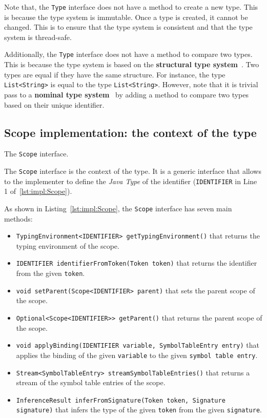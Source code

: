 Note that, the \texttt{Type} interface does not have a method to create a new type. This is because the type system is immutable. Once a type is created, it cannot be changed. This is to ensure that the type system is consistent and that the type system is thread-safe.

Additionally, the \texttt{Type} interface does not have a method to compare two types. This is because the type system is based on the \textbf{structural type system}~\cite{Cardelli88, Cook89}. Two types are equal if they have the same structure. For instance, the type \texttt{List<String>} is equal to the type \texttt{List<String>}. However, note that it is trivial pass to a \textbf{nominal type system}~\cite{Pierce02} by adding a method to compare two types based on their unique identifier.

\subsection{Scope implementation: the context of the type}\label{subsec:impl:Scope}

\begin{Listing}[tbh]
    \centering
    \caption{The \texttt{Scope} interface.}
    \label{lst:impl:Scope}
\end{Listing}

The \texttt{Scope} interface is the context of the type. It is a generic interface that allows to the implementer to define the \textit{Java Type} of the identifier (\texttt{IDENTIFIER} in Line 1 of~\ref{lst:impl:Scope}).

As shown in Listing~\ref{lst:impl:Scope}, the \texttt{Scope} interface has seven main methods:

\begin{itemize}
    \item \texttt{TypingEnvironment<IDENTIFIER> getTypingEnvironment()} that returns the typing environment of the scope.
    \item \texttt{IDENTIFIER identifierFromToken(Token token)} that returns the identifier from the given \texttt{token}.
    \item \texttt{void setParent(Scope<IDENTIFIER> parent)} that sets the parent scope of the scope.
    \item \texttt{Optional<Scope<IDENTIFIER>> getParent()} that returns the parent scope of the scope.
    \item \texttt{void applyBinding(IDENTIFIER variable, SymbolTableEntry entry)} that applies the binding of the given \texttt{variable} to the given \texttt{symbol table entry}.
    \item \texttt{Stream<SymbolTableEntry> streamSymbolTableEntries()} that returns a stream of the symbol table entries of the scope.
    \item \texttt{InferenceResult inferFromSignature(Token token, Signature signature)} that infers the type of the given \texttt{token} from the given \texttt{signature}.
\end{itemize}

